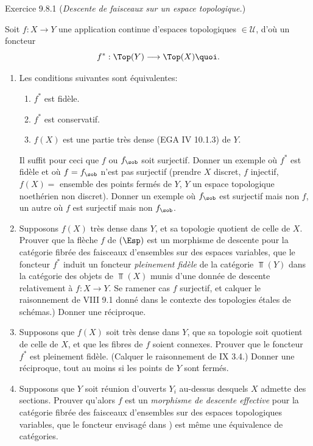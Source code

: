 \documentclass[10pt]{../fichiers-configuration-latex/smfart}
\begin{document}
\begin{enonce*}[remark]{Exercice 9.8.1}
(\emph{Descente de faisceaux sur un espace topologique.})

Soit $f:X\rightarrow Y$ une application continue d'espaces
topologiques $\in 𝒰$, d'où un foncteur
$$
f^{\ast}:\Top(Y)\longrightarrow \Top(X){\quoi}.
$$
\begin{enumerate}
\renewcommand{\theenumi}{\alph{enumi}}
\renewcommand{\labelenumi}{\theenumi)}
\item Les conditions suivantes sont équivalentes:
\begin{enumerate}
\renewcommand{\theenumii}{\roman{enumii}}
\renewcommand{\labelenumii}{(\theenumii)}
\item $f^{\ast}$ est fidèle.

\item $f^{\ast}$ est conservatif.

\item $f(X)$ est une partie très dense (EGA IV 10.1.3) de $Y$.
\end{enumerate}
Il suffit pour ceci que $f$ ou $f_{\sob}$ soit surjectif. Donner un
exemple où $f^{\ast}$ est fidèle et où $f=f_{\sob}$ n'est pas
surjectif (prendre $X$ discret, $f$ injectif, $f(X)=$ ensemble des
points fermés de $Y$, $Y$ un espace topologique noethérien non
discret). Donner un exemple où $f_{\sob}$ est surjectif mais non
$f$, un autre où $f$ est surjectif mais non $f_{\sob}$.

\item Supposons $f(X)$ très dense dans $Y$, et sa topologie quotient
de celle de $X$. Prouver que la flèche $f$ de $(\Esp)$ est un
morphisme de descente pour la catégorie fibrée des faisceaux
d'ensembles sur des espaces variables, \ie que le foncteur
$f^{\ast}$ induit un foncteur \emph{pleinement fidèle}\pageoriginale
de la catégorie $\Top(Y)$ dans la catégorie des objets de $\Top(X)$
munis d'une donnée de descente relativement à $f:X\rightarrow Y$. Se
ramener  cas $f$ surjectif, et calquer le raisonnement de VIII 9.1
donné dans le contexte des topologies étales de schémas.) Donner une
réciproque.

\item Supposons que $f(X)$ soit très dense dans $Y$, que sa topologie
soit quotient de celle de $X$, et que les fibres de $f$ soient
connexes. Prouver que le foncteur $f^{\ast}$ est pleinement fidèle.
(Calquer le raisonnement de  IX 3.4.) Donner une réciproque,
tout au moins si les points de $Y$ sont fermés.

\item Supposons que $Y$ soit réunion d'ouverts $Y_i$ au-dessus
desquels $X$ admette des sections. Prouver qu'alors $f$ est un
\emph{morphisme de descente effective} pour la catégorie fibrée des
faisceaux d'ensembles sur des espaces topologiques variables, \ie
que le foncteur envisagé dans ) est même une équivalence de
catégories.
\end{enumerate}
\end{enonce*}
\end{document}
